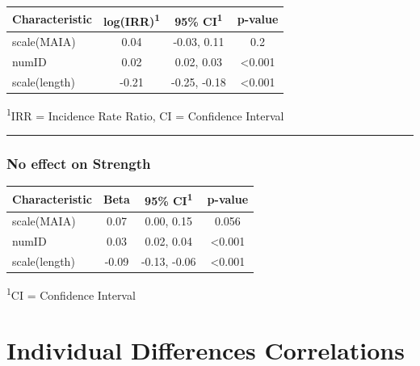 \documentclass[
  .7em,
  letterpaper,
  DIV=11,
  numbers=noendperiod]{scrartcl}
\begin{document}
\captionsetup[table]{labelformat=empty,skip=1pt}
\setlength{\LTpost}{0mm}
\begin{longtable}{lccc}
\toprule
\textbf{Characteristic} & \textbf{log(IRR)}\textsuperscript{1} & \textbf{95\% CI}\textsuperscript{1} & \textbf{p-value} \\ 
\midrule
scale(MAIA) & 0.04 & -0.03, 0.11 & 0.2 \\ 
numID & 0.02 & 0.02, 0.03 & <0.001 \\ 
scale(length) & -0.21 & -0.25, -0.18 & <0.001 \\ 
\bottomrule
\end{longtable}
\begin{minipage}{\linewidth}
\textsuperscript{1}IRR = Incidence Rate Ratio, CI = Confidence Interval\\
\end{minipage}

\begin{center}\rule{0.5\linewidth}{0.5pt}\end{center}

\hypertarget{no-effect-on-strength-4}{%
\subsubsection{No effect on Strength}\label{no-effect-on-strength-4}}

\captionsetup[table]{labelformat=empty,skip=1pt}
\setlength{\LTpost}{0mm}
\begin{longtable}{lccc}
\toprule
\textbf{Characteristic} & \textbf{Beta} & \textbf{95\% CI}\textsuperscript{1} & \textbf{p-value} \\ 
\midrule
scale(MAIA) & 0.07 & 0.00, 0.15 & 0.056 \\ 
numID & 0.03 & 0.02, 0.04 & <0.001 \\ 
scale(length) & -0.09 & -0.13, -0.06 & <0.001 \\ 
\bottomrule
\end{longtable}
\begin{minipage}{\linewidth}
\textsuperscript{1}CI = Confidence Interval\\
\end{minipage}

\hypertarget{individual-differences-correlations}{%
\section{Individual Differences
Correlations}\label{individual-differences-correlations}}
\end{document}
